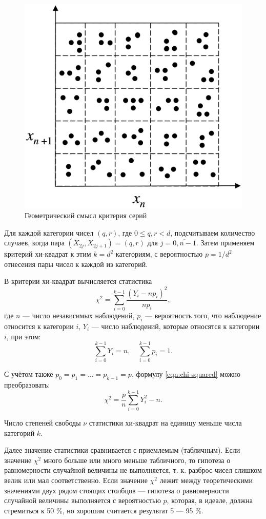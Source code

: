 \documentclass[a4paper,oneside,12pt]{extreport}
\begin{document}
\begin{figure}[H]
	\centering
	\includegraphics[width=0.5\linewidth]{inc/img/serial-test.png}
	\caption{Геометрический смысл критерия серий}
	\label{img:serial-test}
\end{figure}

Для каждой категории чисел $(q, r)$, где $0 \leqslant q, r < d$, подсчитываем количество случаев, когда пара $(X_{2j}, X_{2j + 1}) = (q, r)$ для $j = \overline{0, n - 1}$.
Затем применяем критерий хи-квадрат к этим $k = d^2$ категориям, с вероятностью $p = 1 / d^2$ отнесения пары чисел к каждой из категорий.

В критерии хи-квадрат вычисляется статистика
\begin{equation}
	\label{eqn:chi-squared}
	\chi^2 = \sum_{i = 0}^{k - 1} \frac{(Y_i - np_i)^2}{np_i},
\end{equation}
где $n$ — число независимых наблюдений, $p_i$ — вероятность того, что наблюдение относится к категории $i$, $Y_i$ — число наблюдений, которые относятся к категории $i$, при этом:
\begin{equation}
	\sum_{i = 0}^{k - 1} Y_i = n, \quad \sum_{i = 0}^{k - 1} p_i = 1.
\end{equation}

С учётом также $p_0 = p_1 = \ldots = p_{k - 1} = p$, формулу \eqref{eqn:chi-squared} можно преобразовать:
\begin{equation}
	\chi^2 = \frac pn \sum_{i = 0}^{k - 1} Y_i^2 - n.
\end{equation}

Число степеней свободы $\nu$ статистики хи-квадрат на единицу меньше числа категорий $k$.

Далее значение статистики сравнивается с приемлемым (табличным).
Если значение $\chi^2$ много больше или много меньше табличного, то гипотеза о равномерности случайной величины не выполняется, т. к. разброс чисел слишком велик или мал соответственно.
Если значение $\chi^2$ лежит между теоретическими значениями двух рядом стоящих столбцов —  гипотеза о равномерности случайной величины выполняется с вероятностью $p$, которая, в идеале, должна стремиться к 50 \%, но хорошим считается результат 5 — 95 \%.
\end{document}
